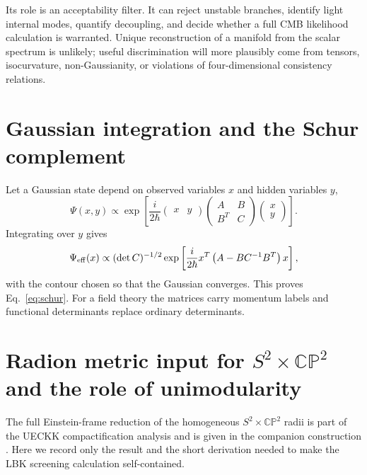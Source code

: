 \documentclass[11pt,a4paper]{article}
\newcommand{\CP}{\mathbb{CP}}
\begin{document}
Its role is an acceptability filter. It can reject unstable branches, identify light internal modes, quantify decoupling, and decide whether a full CMB likelihood calculation is warranted. Unique reconstruction of a manifold from the scalar spectrum is unlikely; useful discrimination will more plausibly come from tensors, isocurvature, non-Gaussianity, or violations of four-dimensional consistency relations.

\appendix
\section{Gaussian integration and the Schur complement}
Let a Gaussian state depend on observed variables $x$ and hidden variables $y$,
\begin{equation}
\Psi(x,y)\propto\exp\left[\frac{i}{2\hbar}
\begin{pmatrix}x&y\end{pmatrix}
\begin{pmatrix}A&B\\B^T&C\end{pmatrix}
\begin{pmatrix}x\\y\end{pmatrix}\right].
\end{equation}
Integrating over $y$ gives
\begin{equation}
\Psi_{\rm eff}(x)\propto
(\det C)^{-1/2}\exp\left[\frac{i}{2\hbar}x^T
\left(A-BC^{-1}B^T\right)x\right],
\end{equation}
with the contour chosen so that the Gaussian converges. This proves Eq.~\eqref{eq:schur}. For a field theory the matrices carry momentum labels and functional determinants replace ordinary determinants.




\section{Radion metric input for $S^2\times\CP^2$ and the role of unimodularity}
\label{app:unimodularG}
The full Einstein-frame reduction of the homogeneous $S^2\times\CP^2$ radii is part of the UECKK compactification analysis and is given in the companion construction \cite{ShayaUECKK2026}. Here we record only the result and the short derivation needed to make the LBK screening calculation self-contained.
\end{document}
